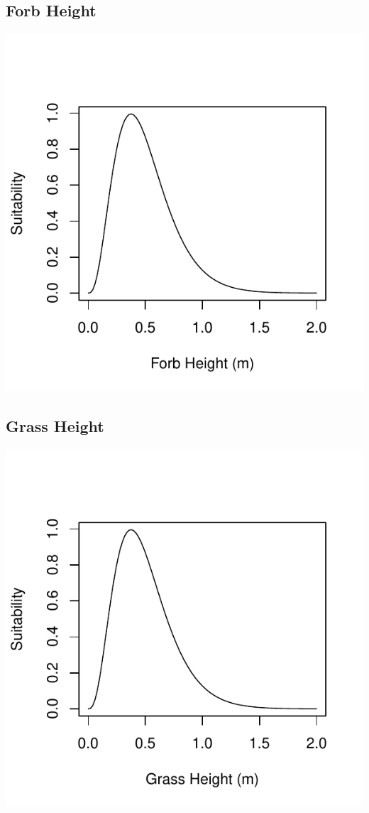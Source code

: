 \documentclass[12pt,letterpaper]{article}\usepackage{graphicx, color}
\makeatletter
\def\maxwidth{ %
  \ifdim\Gin@nat@width>\linewidth
    \linewidth
  \else
    \Gin@nat@width
  \fi
}
\newenvironment{knitrout}{}{} %
\makeatother
\begin{document}
\subsection{Forb Height}
\begin{knitrout}
\color{fgcolor}\includegraphics[width=\maxwidth]{figure/Roy_FH} 
\end{knitrout}

\subsection{Grass Height}
\begin{knitrout}
\color{fgcolor}\includegraphics[width=\maxwidth]{figure/Roy_GH} 
\end{knitrout}
\end{document}
